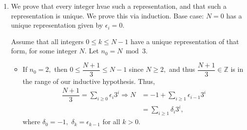 \documentclass[12pt]{article}
\begin{document}
\begin{enumerate}
    Assume for the sake of contradiction that
    \begin{align*}
      \dfrac{2k + 1}{(2k + 2)\sqrt{3k + 1}} > \dfrac{1}{\sqrt{3k + 4}}.
    \end{align*}
    Then, this implies
    \begin{align}
      \dfrac{(2k+1)^2}{(2k+2)^2}  > \dfrac{3k + 1}{3k + 4}
      \Rightarrow (2k + 1)^2(3k+4) > (3k+1)(2k+2)^2, \label{bsq6}
    \end{align}
    yielding
    $$
    (4k^2 + 4k + 1)(3k + 4) > 4(k^2 + 2k + 1)(3k + 1),
    $$
    or equivalently,
    $$
    12k^3 + 28k^2 + 19k + 4 > 12k^3 + 28k^2 + 20k + 4 \Rightarrow 19k > 20k,
    $$
    implying $19 > 20$ (since $k \geq 1$). This is a contradiction, and hence $$
    \dfrac{2k + 1}{(2k + 2)\sqrt{3k + 1}} \leq \dfrac{1}{\sqrt{3k + 4}},
    $$
    meaning
    $$
    \prod_{r = 1}^{ k+ 1} \dfrac{2r - 1}{2r} \leq \dfrac{1}{\sqrt{3(k+1) + 1}},
    $$
    concluding our inductive step. $\therefore$ T by induction.

    Trying \eqref{bsq6} with different coefficients, we get
    $$
    (2k + 1)^2(mk + 4) > 4(mk + 1)(k + 1)^2,
    $$
    which expands out to
    $$
    4mk^3 + (4m + 16)k^2 + (m + 16)k + 4 > 4mk^3 + (8m + 4)k^2 + (4m + 8)k + 4,
    $$
    or equivalently,
    $$
    (12 - 4m)k^2 + (8 - 3m)k > 0.
    $$
    Dividing by $k > 0,$ we get
    $$
    (12 - 4m)k + 8 - 3m > 0,
    $$
    which is only vacuously false if
    \begin{align*}
      12k  + 8 - (3 + 4k)m \leq 0 \Rightarrow m \geq \dfrac{12k +
      8}{3 + 4k} &= \dfrac{(4k + 3) \cdot 3 - 1}{4k + 3} \\
      &= 3- \dfrac{1}{4k + 3}
    \end{align*}
    for all $k > 0,$ requiring $m \geq 3$ to derive a contradiction
    during the inductive step.

  \item We prove that every integer hvae such a representation, and
    that such a representation is unique. We prove this via
    induction. Base case: $N = 0$ has a unique representation given
    by $\epsilon_i = 0.$

    Assume that all integers $0 \leq k \leq N - 1$ have a unique
    representation of that form, for some integer $N$. Let $n_0 = N \bmod 3.$

    \begin{itemize}
      \item If $n_0 = 2,$ then $0 \leq \dfrac{N + 1}{3} \leq N - 1$
        since $N \geq 2,$ and thus $\dfrac{N + 1}{3} \in \mathbb Z$
        is in the range of our inductive hypothesis. Thus,
        \begin{align*}
          \dfrac{N + 1}{3} = \sum_{i \geq 0} \epsilon_i 3^{i}
          \Rightarrow N &= -1 + \sum_{i \geq 1}\epsilon_{i - 1} 3^{i}  \\
          &= \sum_{i \geq 1} \delta_i 3^i,
        \end{align*}
        where $\delta_0 = -1,$ $\delta_k = \epsilon_{k - 1}$ for all $k > 0.$


\end{itemize}
\end{enumerate}
\end{document}

